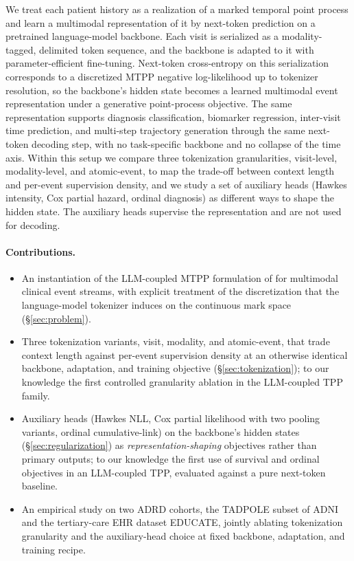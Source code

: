 \documentclass{article}
\begin{document}
We treat each patient history as a realization of a marked temporal point process and learn a multimodal representation of it by next-token prediction on a pretrained language-model backbone.
Each visit is serialized as a modality-tagged, delimited token sequence, and the backbone is adapted to it with parameter-efficient fine-tuning.
Next-token cross-entropy on this serialization corresponds to a discretized MTPP negative log-likelihood up to tokenizer resolution, so the backbone's hidden state becomes a learned multimodal event representation under a generative point-process objective.
The same representation supports diagnosis classification, biomarker regression, inter-visit time prediction, and multi-step trajectory generation through the same next-token decoding step, with no task-specific backbone and no collapse of the time axis.
Within this setup we compare three tokenization granularities, visit-level, modality-level, and atomic-event, to map the trade-off between context length and per-event supervision density, and we study a set of auxiliary heads (Hawkes intensity, Cox partial hazard, ordinal diagnosis) as different ways to shape the hidden state. The auxiliary heads supervise the representation and are not used for decoding.

\paragraph{Contributions.}
\begin{itemize}[leftmargin=*,itemsep=2pt,topsep=2pt]
    \item An instantiation of the LLM-coupled MTPP formulation of \citet{kong2025language,liu2025tpp} for multimodal clinical event streams, with explicit treatment of the discretization that the language-model tokenizer induces on the continuous mark space (§\ref{sec:problem}).
    \item Three tokenization variants, visit, modality, and atomic-event, that trade context length against per-event supervision density at an otherwise identical backbone, adaptation, and training objective (§\ref{sec:tokenization}); to our knowledge the first controlled granularity ablation in the LLM-coupled TPP family.
    \item Auxiliary heads (Hawkes NLL, Cox partial likelihood with two pooling variants, ordinal cumulative-link) on the backbone's hidden states (§\ref{sec:regularization}) as \emph{representation-shaping} objectives rather than primary outputs; to our knowledge the first use of survival and ordinal objectives in an LLM-coupled TPP, evaluated against a pure next-token baseline.
    \item An empirical study on two ADRD cohorts, the TADPOLE subset of ADNI~\citep{adni,marinescu2019tadpole} and the tertiary-care EHR dataset EDUCATE, jointly ablating tokenization granularity and the auxiliary-head choice at fixed backbone, adaptation, and training recipe.
\end{itemize}
\end{document}
